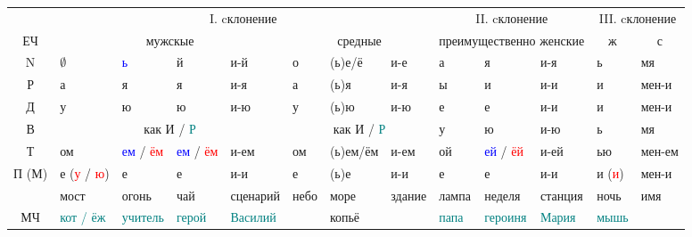 \documentclass[a4paper, landscape, 11pt]{article}
\newcommand{\an}[1]{\textcolor{teal}{#1}} %
\newcommand{\us}[1]{\textcolor{blue}{#1}} %
\newcommand{\st}[1]{\textcolor{red}{#1}}  %
\begin{document}
\begin{tabularx}{\textwidth}{|c|XXXX|XXX|XXX|XX|}
	\hline
	\strut &                                        \multicolumn{7}{c|}{I. cклонение}                                         &      \multicolumn{3}{c|}{II. cклонение}      &      \multicolumn{2}{c|}{III. cклонение}       \\
	  ЕЧ   &                        \multicolumn{4}{c}{мужскые}                         &    \multicolumn{3}{c|}{средные}     & \multicolumn{3}{c|}{преимущественно женские} & \multicolumn{1}{c}{ж} & \multicolumn{1}{c|}{с} \\ \hline
	  N    & $\emptyset$         & \us{ь}            & й                 & и-й          & о           & (ь)е/ё   & и-е        & а           & я                 & и-я        & ь                     & мя                     \\
	  Р    & а                   & я                 & я                 & и-я          & а           & (ь)я     & и-я        & ы           & и                 & и-и        & и                     & мен-и                  \\
	  Д    & у                   & ю                 & ю                 & и-ю          & у           & (ь)ю     & и-ю        & е           & е                 & и-и        & и                     & мен-и                  \\ \cline{2-8}
	  В    &                    \multicolumn{4}{c|}{как И / \an{Р}}                     & \multicolumn{3}{c|}{как И / \an{Р}} & у           & ю                 & и-ю        & ь                     & мя                     \\ \cline{2-8}
	  Т    & ом                  & \us{ем} / \st{ём} & \us{ем} / \st{ём} & и-ем         & ом          & (ь)ем/ём & и-ем       & ой          & \us{ей} / \st{ёй} & и-ей       & ью                    & мен-ем                 \\
	П (М)  & е (\st{у} / \st{ю}) & е                 & е                 & и-и          & е           & (ь)е     & и-и        & е           & е                 & и-и        & и (\st{и})            & мен-и                  \\ \hline
	\strut & мост                & огонь             & чай               & сценарий     & небо        & море     & здание     & лампа       & неделя            & станция    & ночь                  & имя                    \\
	  МЧ   & \an{кот / ёж}       & \an{учитель}      & \an{герой}        & \an{Василий} & \strut      & копьё    & \strut     & \an{папа}   & \an{героиня}      & \an{Мария} & \an{мышь}             & \strut                 \\ \hline

\end{tabularx}
\end{document}

